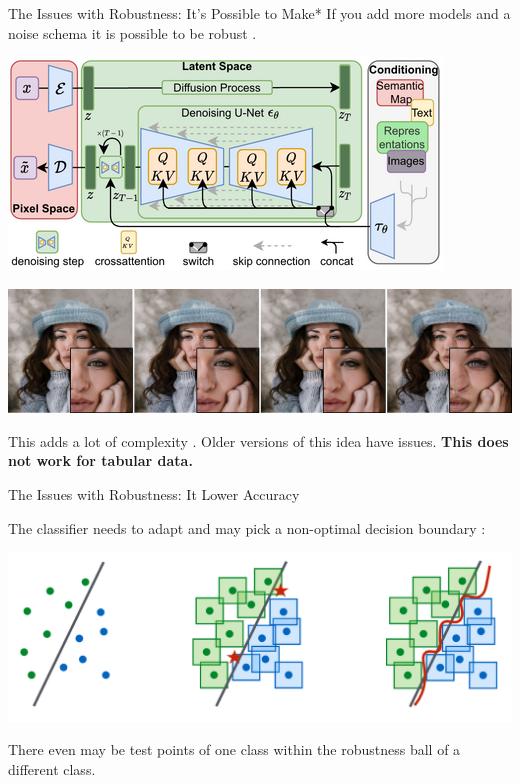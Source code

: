 \documentclass{beamer}
\begin{document}
\begin{frame}{The Issues with Robustness: It's Possible to Make*}
    If you add more models and a noise schema it is possible to be robust \cite{florian_robustness}.
    \begin{center}
        

        \includegraphics[scale=1.1]{latent_modelfigure.png}

        \includegraphics[scale=0.15]{latent_reconstruction2.png}

        This adds a lot of complexity \cite{latent_diffusion_1}\cite{rombach2021highresolution}. Older versions of this idea have issues. \textbf{This does not work for tabular data.}
    \end{center}
\end{frame}

\begin{frame}{The Issues with Robustness: It Lower Accuracy}
    \begin{center}
        The classifier needs to adapt and may pick a non-optimal decision boundary \cite{robustness_issue}:

        \includegraphics[scale=0.25]{robustness_issue.png}

        There even may be test points of one class within the robustness ball of a different class. 
    \end{center}
\end{frame}
\end{document}
